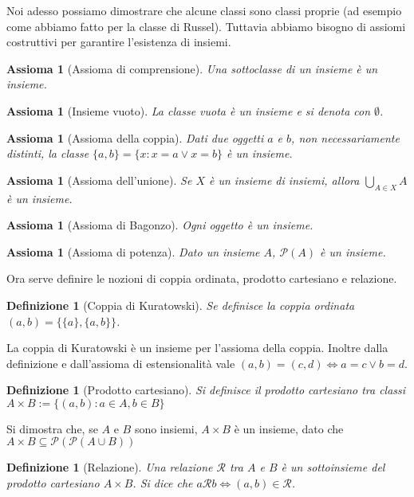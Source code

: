 \documentclass[a4paper,10pt,oneside]{article}
\newcommand{\myname}[1]{\emph{#1}}
\newcommand{\parti}[1]{\mathcal{P}(#1)}
\newcommand{\rel}{\mathcal R}
\theoremstyle{plain}
\newtheorem{mydef}[mytheorem]{Definizione}
\newtheorem{myax}[mytheorem]{Assioma}
\theoremstyle{definition}
\theoremstyle{remark}
\begin{document}
Noi adesso possiamo dimostrare che alcune classi sono classi proprie (ad esempio come abbiamo fatto per la classe di Russel). Tuttavia abbiamo bisogno di assiomi costruttivi per garantire l'esistenza di insiemi.

\begin{myax}[Assioma di comprensione]
 Una sottoclasse di un insieme è un insieme.
\end{myax}
\begin{myax}[Insieme vuoto]
 La classe vuota è un insieme e si denota con $\emptyset$. 
\end{myax}
\begin{myax}[Assioma della coppia]
 Dati due oggetti $a$ e $b$, non necessariamente distinti, la classe $\{a,b\} = \{x:x=a \lor x=b\}$ è un insieme.
\end{myax}
\begin{myax}[Assioma dell'unione]
 Se $X$ è un insieme di insiemi, allora $\bigcup_{A\in X} A$ è un insieme.
\end{myax}
\begin{myax}[Assioma di Bagonzo]
 Ogni oggetto è un insieme.
\end{myax}
\begin{myax}[Assioma di potenza]
 Dato un insieme $A$, $\mathcal{P}(A)$ è un insieme.
\end{myax}

Ora serve definire le nozioni di coppia ordinata, prodotto cartesiano e relazione. 

\begin{mydef}[Coppia di Kuratowski]
 Se definisce la \myname{coppia ordinata} $(a,b) = \{\{a\},\{a,b\}\}$.
\end{mydef}
La coppia di Kuratowski è un insieme per l'assioma della coppia. Inoltre dalla definizione e dall'assioma di estensionalità vale $(a,b)=(c,d) \Leftrightarrow a=c \lor b=d$.

\begin{mydef}[Prodotto cartesiano]
 Si definisce il prodotto cartesiano tra classi $A\times B := \{(a,b): a\in A, b\in B\}$
\end{mydef}

Si dimostra che, se $A$ e $B$ sono insiemi, $A\times B$ è un insieme, dato che $A\times B \subseteq \parti{\parti{A\cup B}}$

\begin{mydef}[Relazione]
 Una \myname{relazione} $\rel$ tra $A$ e $B$ è un sottoinsieme del prodotto cartesiano $A\times B$. Si dice che $a\rel b \Leftrightarrow (a,b) \in \rel$.
\end{mydef}
\end{document}

